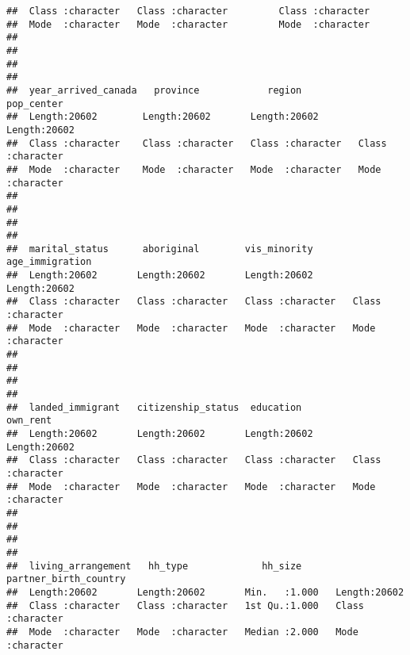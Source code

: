\documentclass[
]{article}
\begin{document}
\begin{verbatim}
##  Class :character   Class :character         Class :character    
##  Mode  :character   Mode  :character         Mode  :character    
##                                                                  
##                                                                  
##                                                                  
##                                                                  
##  year_arrived_canada   province            region           pop_center       
##  Length:20602        Length:20602       Length:20602       Length:20602      
##  Class :character    Class :character   Class :character   Class :character  
##  Mode  :character    Mode  :character   Mode  :character   Mode  :character  
##                                                                              
##                                                                              
##                                                                              
##                                                                              
##  marital_status      aboriginal        vis_minority       age_immigration   
##  Length:20602       Length:20602       Length:20602       Length:20602      
##  Class :character   Class :character   Class :character   Class :character  
##  Mode  :character   Mode  :character   Mode  :character   Mode  :character  
##                                                                             
##                                                                             
##                                                                             
##                                                                             
##  landed_immigrant   citizenship_status  education           own_rent        
##  Length:20602       Length:20602       Length:20602       Length:20602      
##  Class :character   Class :character   Class :character   Class :character  
##  Mode  :character   Mode  :character   Mode  :character   Mode  :character  
##                                                                             
##                                                                             
##                                                                             
##                                                                             
##  living_arrangement   hh_type             hh_size      partner_birth_country
##  Length:20602       Length:20602       Min.   :1.000   Length:20602         
##  Class :character   Class :character   1st Qu.:1.000   Class :character     
##  Mode  :character   Mode  :character   Median :2.000   Mode  :character     

\end{verbatim}
\end{document}
